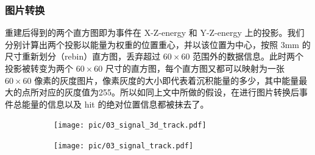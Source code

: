 \subsubsection{图片转换}

    重建后得到的两个直方图即为事件在 X-Z-energy 和 Y-Z-energy 上的投影。我们分别计算出两个投影以能量为权重的位置重心，并以该位置为中心，按照 3mm 的尺寸重新划分（rebin）直方图，丢弃超过 $60\times60$ 范围外的数据信息。此时两个投影被转变为两个 $60\times60$ 尺寸的直方图，每个直方图又都可以映射为一张 $60\times60$ 像素的灰度图片，像素灰度的大小即代表着沉积能量的多少，其中能量最大的点所对应的灰度值为255。所以如同上文中所做的假设，在进行图片转换后事件总能量的信息以及 hit 的绝对位置信息都被抹去了。

    \begin{figure}
        \centering
        \begin{subfigure}[t]{0.22\textwidth}
          \centering
          \texttt{[image: pic/03\_signal\_3d\_track.pdf]}
          \caption{}
        \end{subfigure}
        \begin{subfigure}[t]{0.44\textwidth}
          \centering
          \texttt{[image: pic/03\_signal\_track.pdf]}
          \caption{}
        \end{subfigure}
        \begin{subfigure}[t]{0.16\textwidth}
          \centering
          \setlength{\fboxsep}{0pt}
          \caption{}
        \end{subfigure}
        

\end{figure}
